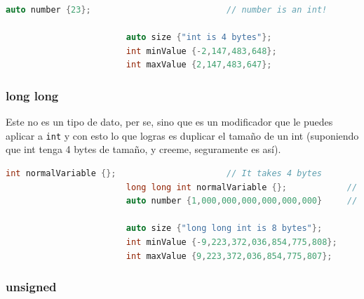 \documentclass[12pt, fleqn]{report}                             %
\theoremstyle{break}                                            %
\begin{document}
                    \begin{lstlisting}[language=C++, gobble=24]
                        auto number {23};                           // number is an int!

                        auto size {"int is 4 bytes"};
                        int minValue {-2,147,483,648};
                        int maxValue {2,147,483,647};
                    \end{lstlisting}

                \subsubsection{long long}

                    Este no es un tipo de dato, per se, sino que es un modificador que le puedes aplicar
                    a \texttt{int} y con esto lo que logras es duplicar el tamaño de un int (suponiendo
                    que int tenga 4 bytes de tamaño, y creeme, seguramente es así).
                    
                    \begin{lstlisting}[language=C++, gobble=24]
                        int normalVariable {};                      // It takes 4 bytes     
                        long long int normalVariable {};            // It takes 8 bytes 
                        auto number {1,000,000,000,000,000,000}     // number is long long  

                        auto size {"long long int is 8 bytes"};
                        int minValue {-9,223,372,036,854,775,808};
                        int maxValue {9,223,372,036,854,775,807};
                    \end{lstlisting}


                \subsubsection{unsigned}
\end{document}
